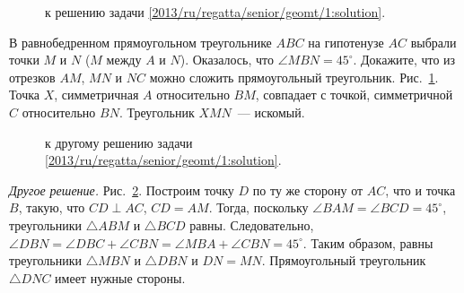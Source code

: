 \ifsolution
\begin{figure}\centering
    \caption{к решению задачи \ref{2013/ru/regatta/senior/geomt/1:solution}.}
    \label{2013/ru/regatta/senior/geomt/1:solution:fig}
\end{figure}%
\fi %

\problem
В равнобедренном прямоугольном треугольнике $ABC$ на гипотенузе $AC$ выбрали
точки $M$ и $N$ ($M$ между $A$ и $N$).
Оказалось, что $\angle MBN = 45^\circ$.
Докажите, что из отрезков $AM$, $MN$ и $NC$ можно сложить прямоугольный
треугольник.
\solution
\label{2013/ru/regatta/senior/geomt/1:solution}%
Рис.~\ref{2013/ru/regatta/senior/geomt/1:solution:fig}.
Точка $X$, симметричная $A$ относительно $BM$, совпадает с точкой, симметричной
$C$ относительно $BN$.
Треугольник $XMN$~--- искомый.
\par
\begin{figure}\centering
    \caption{к другому решению задачи
        \ref{2013/ru/regatta/senior/geomt/1:solution}.}
    \label{2013/ru/regatta/senior/geomt/1:solution:fig/another}
\end{figure}%
\emph{Другое решение.}
Рис.~\ref{2013/ru/regatta/senior/geomt/1:solution:fig/another}.
Построим точку $D$ по ту же сторону от $AC$, что и точка $B$, такую, что
$CD \perp AC$, $CD = AM$.
Тогда, поскольку $\angle BAM = \angle BCD = 45^\circ$, треугольники
$\triangle ABM$ и $\triangle BCD$ равны.
Следовательно,
$\angle DBN = \angle DBC + \angle CBN = \angle MBA + \angle CBN = 45^\circ$.
Таким образом, равны треугольники $\triangle MBN$ и $\triangle DBN$ и
$DN = MN$.
Прямоугольный треугольник $\triangle DNC$ имеет нужные стороны.
\endproblem
